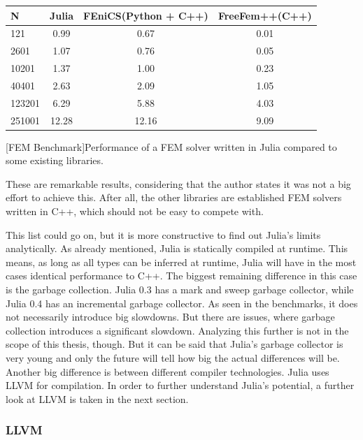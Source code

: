 \begin{table}[htbp]
    \centering
    \begin{tabular}{l|c|c|c}
        \hline
        \textbf{N}  & \textbf{Julia} & \textbf{FEniCS(Python + C++)}  & \textbf{FreeFem++(C++)}\\
        \hline
        121         & 0.99           & 0.67             & 0.01 \\
        2601        & 1.07           & 0.76             & 0.05 \\
        10201       & 1.37           & 1.00             & 0.23 \\
        40401       & 2.63           & 2.09             & 1.05 \\
        123201      & 6.29           & 5.88             & 4.03 \\
        251001      & 12.28          & 12.16            & 9.09 \\
        \hline
    \end{tabular}
    [FEM Benchmark]{Performance of a FEM solver written in Julia compared to some existing libraries. \cite{FMSolver}}
    \label{table:fembench}
\end{table}
These are remarkable results, considering that the author states it was not a big effort to achieve this. After all, the other libraries are established FEM solvers written in C++, which should not be easy to compete with.

This list could go on, but it is more constructive to find out Julia's limits analytically.
As already mentioned, Julia is statically compiled at runtime. This means, as long as all types can be inferred at runtime, Julia will have in the most cases identical performance to C++.
The biggest remaining difference in this case is the garbage collection. 
Julia 0.3 has a mark and sweep garbage collector, while Julia 0.4 has an incremental garbage collector.
As seen in the benchmarks, it does not necessarily introduce big slowdowns.
But there are issues, where garbage collection introduces a significant slowdown\cite{ReadDlmGC}.
Analyzing this further is not in the scope of this thesis, though. 
But it can be said that Julia's garbage collector is very young and only the future will tell how big the actual differences will be.
Another big difference is between different compiler technologies.
Julia uses \ac{LLVM} for compilation.
In order to further understand Julia's potential, a further look at LLVM is taken in the next section.

\subsubsection{\ac{LLVM}}

